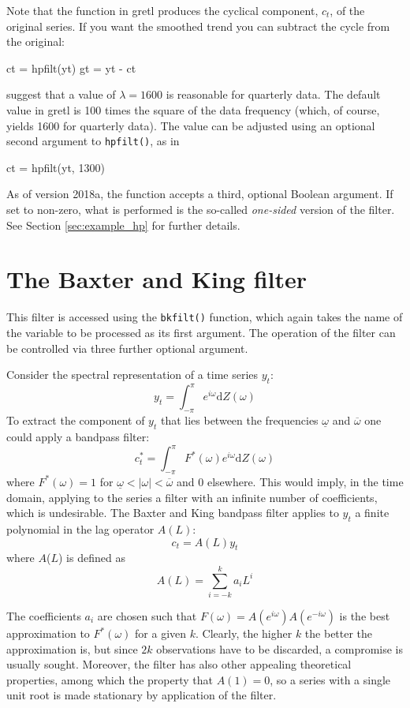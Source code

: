 Note that the  function in gretl produces the
cyclical component, $c_t$, of the original series.  If you want the
smoothed trend you can subtract the cycle from the original:

\begin{code}
ct = hpfilt(yt)
gt = yt - ct
\end{code}

\cite{hodrick97} suggest that a value of $\lambda = 1600$ is reasonable
for quarterly data.  The default value in gretl is 100 times the
square of the data frequency (which, of course, yields 1600 for
quarterly data).  The value can be adjusted using an optional
second argument to \verb+hpfilt()+, as in
%
\begin{code}
ct = hpfilt(yt, 1300)
\end{code}

As of version 2018a, the  function accepts a third,
optional Boolean argument. If set to non-zero, what is performed is
the so-called \emph{one-sided} version of the filter. See Section
\ref{sec:example_hp} for further details.

\section{The Baxter and King filter}
\label{sec:baxter-king}

This filter is accessed using the \verb+bkfilt()+ function, which
again takes the name of the variable to be processed as its first
argument. The operation of the filter can be controlled via three
further optional argument.

Consider the spectral representation of a time series $y_t$:
%       
\[ y_t = \int_{-\pi}^{\pi} e^{i\omega} \mathrm{d} Z(\omega) \]
%
To extract the component of $y_t$ that lies between the frequencies
$\underline{\omega}$ and $\overline{\omega}$ one could apply a
bandpass filter:
%       
\[ c^*_t = \int_{-\pi}^{\pi} F^*(\omega) e^{i\omega} \mathrm{d}
Z(\omega) \]
%
where $F^*(\omega) = 1$ for $\underline{\omega} < |\omega| <
\overline{\omega}$ and 0 elsewhere. This would imply, in the time
domain, applying to the series a filter with an infinite number of
coefficients, which is undesirable. The Baxter and King bandpass
filter applies to $y_t$ a finite polynomial in the lag
operator $A(L)$:
%       
\[ c_t = A(L) y_t \]
%
where $A$($L$) is defined as
%       
\[ A(L) = \sum_{i=-k}^{k} a_i L^i \]

The coefficients $a_i$ are chosen such that $F(\omega)
= A(e^{i\omega})A(e^{-i\omega})$ is the best approximation to
$F^*(\omega)$ for a given $k$. Clearly, the higher $k$ the better the
approximation is, but since $2k$ observations have to be discarded, a
compromise is usually sought. Moreover, the filter has also other
appealing theoretical properties, among which the property that $A(1)
= 0$, so a series with a single unit root is made stationary by
application of the filter.


